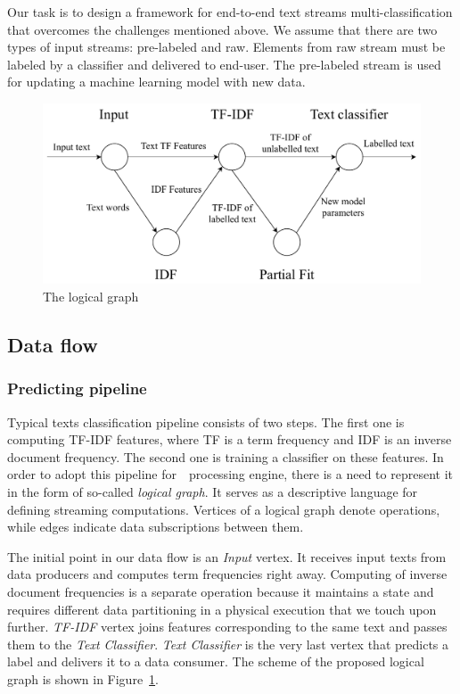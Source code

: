 \label{fs-framework}

Our task is to design a framework for end-to-end text streams multi-classification that overcomes the challenges mentioned above. We assume that there are two types of input streams: pre-labeled and raw. Elements from raw stream must be labeled by a classifier and delivered to end-user. The pre-labeled stream is used for updating a machine learning model with new data.

\begin{figure}[htbp]
  \centering
  \includegraphics[scale=0.48]{pics/logical-graph}
  \caption{The logical graph}
  \label {logical_graph}
\end{figure}

\subsection{Data flow \label{DF}}

\subsubsection{Predicting pipeline}

Typical texts classification pipeline consists of two steps. The first one is computing TF-IDF features, where TF is a term frequency and IDF is an inverse document frequency. The second one is training a classifier on these features. In order to adopt this pipeline for~\FlameStream\ processing engine, there is a need to represent it in the form of so-called {\em logical graph}. It serves as a descriptive language for defining streaming computations. Vertices of a logical graph denote operations, while edges indicate data subscriptions between them. 

The initial point in our data flow is an {\em Input} vertex. It receives input texts from data producers and computes term frequencies right away. Computing of inverse document frequencies is a separate operation because it maintains a state and requires different data partitioning in a physical execution that we touch upon further. {\em TF-IDF} vertex joins features corresponding to the same text and passes them to the {\em Text Classifier}. {\em Text Classifier} is the very last vertex that predicts a label and delivers it to a data consumer. The scheme of the proposed logical graph is shown in Figure~\ref{logical_graph}.

